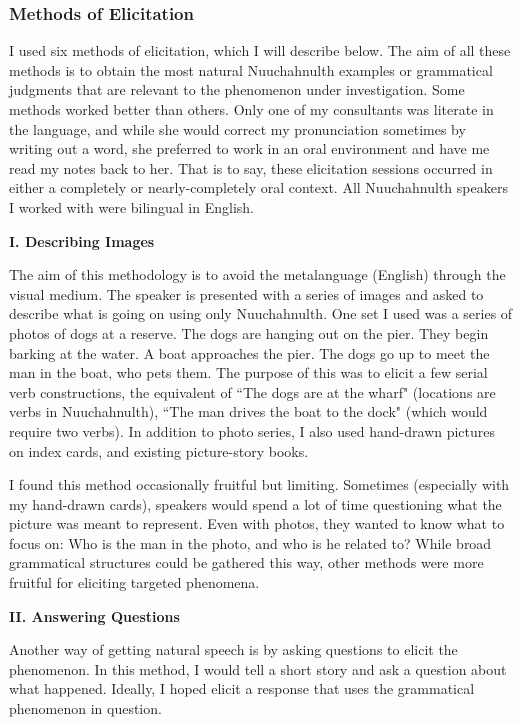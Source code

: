 \subsubsection{Methods of Elicitation}

I used six methods of elicitation, which I will describe below. The aim of all these methods is to obtain the most natural Nuuchahnulth examples or grammatical judgments that are relevant to the phenomenon under investigation. Some methods worked better than others. Only one of my consultants was literate in the language, and while she would correct my pronunciation sometimes by writing out a word, she preferred to work in an oral environment and have me read my notes back to her. That is to say, these elicitation sessions occurred in either a completely or nearly-completely oral context. All Nuuchahnulth speakers I worked with were bilingual in English.

\vspace{8pt}

\noindent \textbf{I. Describing Images}

The aim of this methodology is to avoid the metalanguage (English) through the visual medium. The speaker is presented with a series of images and asked to describe what is going on using only Nuuchahnulth. One set I used was a series of photos of dogs at a reserve. The dogs are hanging out on the pier. They begin barking at the water. A boat approaches the pier. The dogs go up to meet the man in the boat, who pets them. The purpose of this was to elicit a few serial verb constructions, the equivalent of ``The dogs are at the wharf" (locations are verbs in Nuuchahnulth), ``The man drives the boat to the dock" (which would require two verbs). In addition to photo series, I also used hand-drawn pictures on index cards, and existing picture-story books.

I found this method occasionally fruitful but limiting. Sometimes (especially with my hand-drawn cards), speakers would spend a lot of time questioning what the picture was meant to represent. Even with photos, they wanted to know what to focus on: Who is the man in the photo, and who is he related to? While broad grammatical structures could be gathered this way, other methods were more fruitful for eliciting targeted phenomena.

\vspace{8pt}

\noindent \textbf{II. Answering Questions}

Another way of getting natural speech is by asking questions to elicit the phenomenon. In this method, I would tell a short story and ask a question about what happened. Ideally, I hoped elicit a response that uses the grammatical phenomenon in question.

